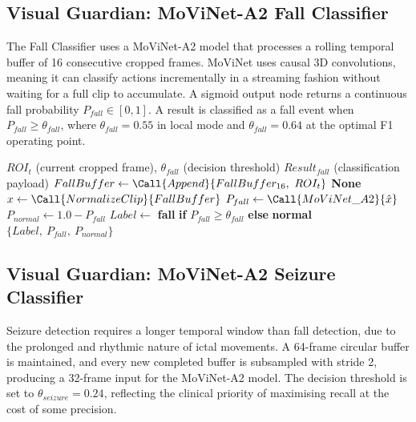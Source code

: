 \subsection{Visual Guardian: MoViNet-A2 Fall Classifier}
\label{subsec:fall}

The Fall Classifier uses a MoViNet-A2 model that processes a rolling temporal
buffer of 16 consecutive cropped frames. MoViNet uses causal 3D convolutions,
meaning it can classify actions incrementally in a streaming fashion without
waiting for a full clip to accumulate. A sigmoid output node returns a continuous
fall probability $P_{fall} \in [0, 1]$. A result is classified as a fall event
when $P_{fall} \geq \theta_{fall}$, where $\theta_{fall} = 0.55$ in local mode
and $\theta_{fall} = 0.64$ at the optimal F1 operating point.

\begin{algorithm}[H]
\caption{MoViNet-A2 Streaming Fall Classification}
\label{alg:fall}
\begin{algorithmic}[1]
\Require $ROI_t$ (current cropped frame), $\theta_{fall}$ (decision threshold)
\Ensure $Result_{fall}$ (classification payload)
\State $FallBuffer \gets \Call{Append}{FallBuffer_{16},\ ROI_t}$
    \State \Return \textbf{None} 
\EndIf
\State $x \gets \Call{NormalizeClip}{FallBuffer}$ 
\State $P_{fall} \gets \Call{MoViNet\_A2}{\hat{x}}$
\State $P_{normal} \gets 1.0 - P_{fall}$
\State $Label \gets$ \textbf{fall} \textbf{if} $P_{fall} \geq \theta_{fall}$ \textbf{else} \textbf{normal}
\State \Return $\{Label,\ P_{fall},\ P_{normal}\}$
\end{algorithmic}
\end{algorithm}

\subsection{Visual Guardian: MoViNet-A2 Seizure Classifier}
\label{subsec:seizure}

Seizure detection requires a longer temporal window than fall detection, due to
the prolonged and rhythmic nature of ictal movements. A 64-frame circular buffer
is maintained, and every new completed buffer is subsampled with stride 2,
producing a 32-frame input for the MoViNet-A2 model. The decision threshold is
set to $\theta_{seizure} = 0.24$, reflecting the clinical priority of maximising
recall at the cost of some precision.

